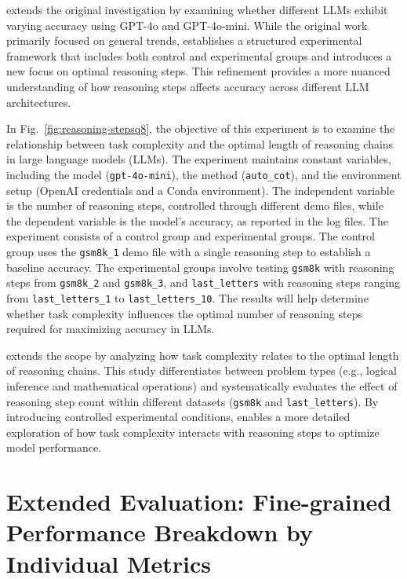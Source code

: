 \sys extends the original investigation by examining whether different LLMs exhibit varying accuracy using GPT-4o and GPT-4o-mini. While the original work primarily focused on general trends, \sys establishes a structured experimental framework that includes both control and experimental groups and introduces a new focus on optimal reasoning steps. This refinement provides a more nuanced understanding of how reasoning steps affects accuracy across different LLM architectures.

In Fig.~\ref{fig:reasoning-stepsq8}, 
the objective of this experiment is to examine the relationship between task complexity and the optimal length of reasoning chains in large language models (LLMs). The experiment maintains constant variables, including the model (\texttt{gpt-4o-mini}), the method (\texttt{auto\_cot}), and the environment setup (OpenAI credentials and a Conda environment). The independent variable is the number of reasoning steps, controlled through different demo files, while the dependent variable is the model’s accuracy, as reported in the log files. The experiment consists of a control group and experimental groups. The control group uses the \texttt{gsm8k\_1} demo file with a single reasoning step to establish a baseline accuracy. The experimental groups involve testing \texttt{gsm8k} with reasoning steps from \texttt{gsm8k\_2} and \texttt{gsm8k\_3}, and \texttt{last\_letters} with reasoning steps ranging from \texttt{last\_letters\_1} to \texttt{last\_letters\_10}. The results will help determine whether task complexity influences the optimal number of reasoning steps required for maximizing accuracy in LLMs.

\sys extends the scope by analyzing how task complexity relates to the optimal length of reasoning chains. This study differentiates between problem types (e.g., logical inference and mathematical operations) and systematically evaluates the effect of reasoning step count within different datasets (\texttt{gsm8k} and \texttt{last\_letters}). By introducing controlled experimental conditions, \sys enables a more detailed exploration of how task complexity interacts with reasoning steps to optimize model performance.  



\section{Extended Evaluation: Fine-grained Performance Breakdown by Individual Metrics}
\label{appendix:additional-results}

